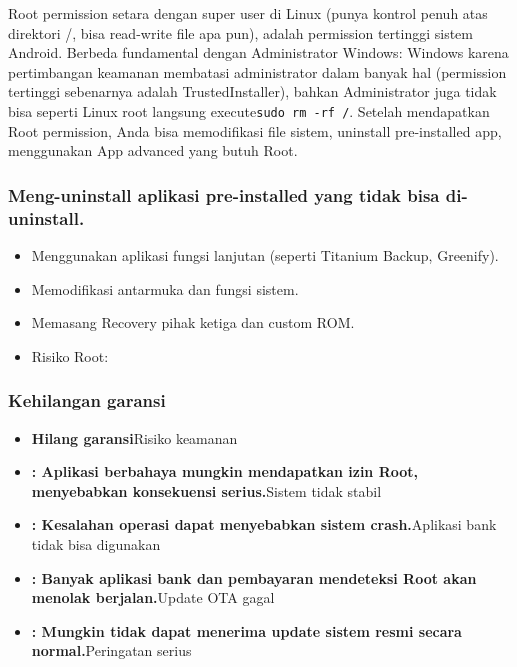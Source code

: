 
Root permission setara dengan super user di Linux (punya kontrol penuh atas direktori /, bisa read-write file apa pun), adalah permission tertinggi sistem Android. Berbeda fundamental dengan Administrator Windows: Windows karena pertimbangan keamanan membatasi administrator dalam banyak hal (permission tertinggi sebenarnya adalah TrustedInstaller), bahkan Administrator juga tidak bisa seperti Linux root langsung execute\texttt{sudo rm -\allowbreak rf /\allowbreak *}. Setelah mendapatkan Root permission, Anda bisa memodifikasi file sistem, uninstall pre-installed app, menggunakan App advanced yang butuh Root.

\subsubsection*{Meng-uninstall aplikasi pre-installed yang tidak bisa di-uninstall.}

\begin{itemize}
  \item Menggunakan aplikasi fungsi lanjutan (seperti Titanium Backup, Greenify).
  \item Memodifikasi antarmuka dan fungsi sistem.
  \item Memasang Recovery pihak ketiga dan custom ROM.
  \item Risiko Root:
\end{itemize}

\subsubsection*{Kehilangan garansi}

\begin{itemize}
  \item \textbf{Hilang garansi}Risiko keamanan
  \item \textbf{: Aplikasi berbahaya mungkin mendapatkan izin Root, menyebabkan konsekuensi serius.}Sistem tidak stabil
  \item \textbf{: Kesalahan operasi dapat menyebabkan sistem crash.}Aplikasi bank tidak bisa digunakan
  \item \textbf{: Banyak aplikasi bank dan pembayaran mendeteksi Root akan menolak berjalan.}Update OTA gagal
  \item \textbf{: Mungkin tidak dapat menerima update sistem resmi secara normal.}Peringatan serius
\end{itemize}

